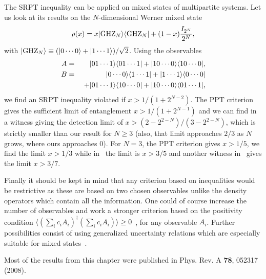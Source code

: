 The SRPT inequality can be applied on mixed states of multipartite systems. Let us look at its results on the $N$-dimensional Werner mixed state 
\[ \rho(x)= x | \mbox{GHZ}_N \rangle \langle \mbox{GHZ}_N | +(1-x)\frac{I_{2^N}}{2^N},\] 
with $| \mbox{GHZ}_N \rangle \equiv (| 0\cdots0 \rangle+| 1\cdots1 \rangle)/\sqrt 2$.  Using the observables
\begin{eqnarray}
A&=&| 01\cdots 1 \rangle \langle 01\cdots1 |+| 10\cdots 0 \rangle \langle 10\cdots 0 |,\\
B&=&| 0\cdots 0 \rangle \langle 1\cdots1 |+| 1\cdots 1 \rangle \langle 0\cdots 0 | \nonumber \\
 && \ +| 01\cdots 1 \rangle \langle 10\cdots0 |+| 10\cdots 0 \rangle \langle 01\cdots 1 |,
\end{eqnarray}
we find an SRPT inequality violated if $x> 1/(1+2^{N-2})$. The PPT criterion gives the sufficient limit of entanglement $x> 1/(1+2^{N-1})$ and we can find in~\cite{Tot05} a witness giving the detection limit  of $x>(2-2^{2-N})/(3-2^{2-N})$, which is strictly smaller than our result for $N \geq 3$ (also, that limit approaches $2/3$ as $N$ grows, where ours approaches 0). For $N=3$, the PPT criterion gives $x>1/5$, we find the limit $x>1/3$ while in~\cite{Tot05} the limit is $x>3/5$ and another witness in~\cite{Guh04} gives the limit $x>3/7$.

Finally it should be kept in mind that any criterion based on inequalities would be restrictive as these are based on two chosen observables unlike the density operators which contain all the information. One could of course increase the number of observables and work a stronger criterion  based on the positivity condition $\langle \left( \sum_i c_i A_{i} \right)^\dagger \left(\sum_i c_i A_{i} \right)  \rangle \ge 0$~\cite{Ush07},
for any observable $A_{i}$. Further possibilities consist of using generalized uncertainty relations which are especially suitable for mixed states~\cite{Aga03}. 

Most of the results from this chapter were published in Phys. Rev. A \textbf{78}, 052317 (2008).
